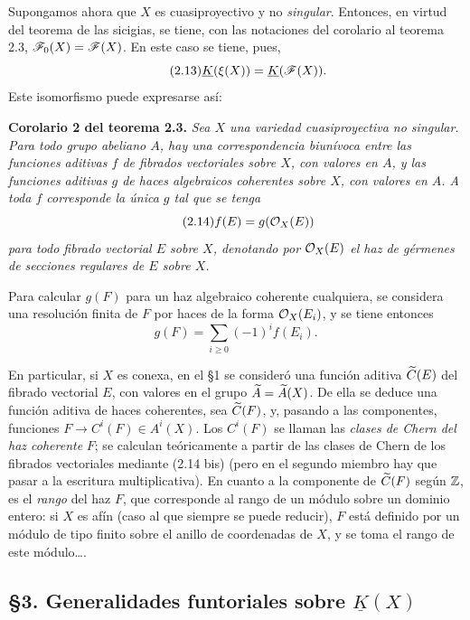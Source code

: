 Supongamos ahora que $X$ es cuasiproyectivo y no \emph{singular}. Entonces, en virtud del teorema de las sicigias, se tiene, con las notaciones del corolario al teorema 2.3, $\mathscr F_0(X)=\mathscr F(X)$. En este caso se tiene, pues,
\begin{equation}\tag{2.13}
 \underline{K}(\xi(X))=\underline{K}(\mathscr F(X)).
\end{equation}
Este isomorfismo puede expresarse así:

\textbf{Corolario 2 del teorema 2.3.} \emph{Sea $X$ una variedad cuasiproyectiva no singular. Para todo grupo abeliano $A$, hay una correspondencia biunívoca entre las funciones aditivas $f$ de fibrados vectoriales sobre $X$, con valores en $A$, y las funciones aditivas $g$ de haces algebraicos coherentes sobre $X$, con valores en $A$. A toda $f$ corresponde la única $g$ tal que se tenga}
\begin{equation}\tag{2.14}
 f(E)=g(\mathcal O_X(E))
\end{equation}
\emph{para todo fibrado vectorial $E$ sobre $X$, denotando por $\mathcal O_X(E)$ el haz de gérmenes de secciones regulares de $E$ sobre $X$.}

Para calcular $g(F)$ para un haz algebraico coherente cualquiera, se considera una resolución finita de $F$ por haces de la forma $\mathcal O_X(E_i)$, y se tiene entonces
\begin{equation}\tag{2.14 bis}
 g(F)=\sum_{i\geq0}(-1)^if(E_i).
\end{equation}

En particular, si $X$ es conexa, en el \S 1 se consideró una función aditiva $\widetilde C(E)$ del fibrado vectorial $E$, con valores en el grupo $\widetilde A=\widetilde A(X)$. De ella se deduce una función aditiva de haces coherentes, sea $\widetilde C(F)$, y, pasando a las componentes, funciones $F\longrightarrow C^i(F)\in A^i(X)$. Los $C^i(F)$ se llaman las \emph{clases de Chern del haz coherente} $F$; se calculan teóricamente a partir de las clases de Chern de los fibrados vectoriales mediante (2.14 bis) (pero en el segundo miembro hay que pasar a la escritura multiplicativa). En cuanto a la componente de $\widetilde C(F)$ según $\mathbb Z$, es el \emph{rango} del haz $F$, que corresponde al rango de un módulo sobre un dominio entero: si $X$ es afín (caso al que siempre se puede reducir), $F$ está definido por un módulo de tipo finito sobre el anillo de coordenadas de $X$, y se toma el rango de este módulo\dots.

\subsection*{\S 3. Generalidades funtoriales sobre $\underline{K}(X)$}

